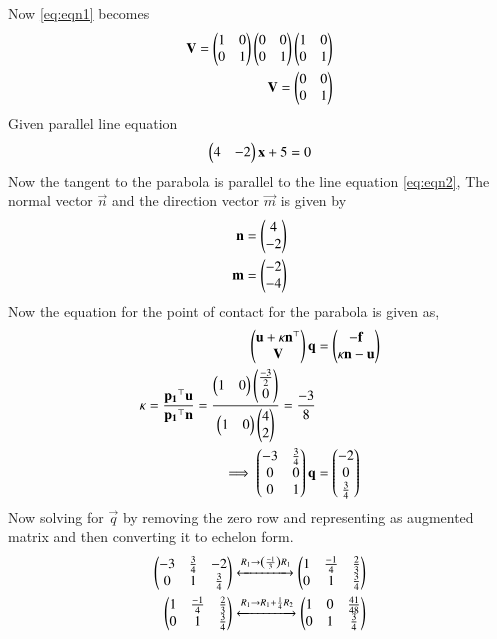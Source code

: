 \documentclass[journal,12pt,twocolumn]{IEEEtran}
\begin{document}
Now \eqref{eq:eqn1} becomes
\begin{align}
    \mathbf{V}=\begin{pmatrix}1&0 \\ 0&1\end{pmatrix}\begin{pmatrix}0&0 \\ 0&1\end{pmatrix}\begin{pmatrix}1&0 \\ 0&1\end{pmatrix}
    \\
    \mathbf{V}=\begin{pmatrix}0&0 \\ 0&1\end{pmatrix}
\end{align}
Given parallel line equation 
\begin{align}
 \begin{pmatrix}4&-2\end{pmatrix}\mathbf{x} + 5 = 0\label{eq:eqn2}
\end{align}
Now the tangent to the parabola is parallel to the line equation \eqref{eq:eqn2},
The normal vector $\vec{n}$ and the direction vector $\vec{m}$ is given by 
\begin{align}
    \mathbf{n}=\begin{pmatrix}4 \\ -2\end{pmatrix} \label{eq:eqn5}
    \\
    \mathbf{m}=\begin{pmatrix}-2 \\ -4\end{pmatrix}
\end{align}
Now the equation for the point of contact for the parabola is given as,
\begin{align}
    \begin{pmatrix}\mathbf{u}+\kappa \mathbf{n}^{\top} \\ \mathbf{V} \end{pmatrix}\mathbf{q} &= \begin{pmatrix}\mathbf{-f}\\\kappa \mathbf{n} -\mathbf{u}\end{pmatrix}
    \\
    \kappa =\frac{\mathbf{p_{1}}^{\top}\mathbf{u}}{\mathbf{p_{1}}^{\top}\mathbf{n}}
    =\frac{\begin{pmatrix}1&0\end{pmatrix}\begin{pmatrix}\frac{-3}{2} \\ 0\end{pmatrix}}{\begin{pmatrix}1&0\end{pmatrix}\begin{pmatrix}4 \\ 2\end{pmatrix}}
    =\frac{-3}{8}
    \\
   \implies\begin{pmatrix}-3&\frac{3}{4} \\ 0&0 \\ 0&1\end{pmatrix} \mathbf{q}&= \begin{pmatrix}-2 \\ 0 \\ \frac{3}{4}\end{pmatrix}
\end{align}
Now solving for $\vec{q}$ by removing the zero row and representing as augmented matrix and then converting it to echelon form.
\begin{align}
    \begin{pmatrix}-3&\frac{3}{4}&-2 \\ 0&1&\frac{3}{4}\end{pmatrix}\xleftrightarrow{R_1\rightarrow \ensuremath{\left(\frac{-1}{3}\right)}R_1} \begin{pmatrix}1&\frac{-1}{4}&\frac{2}{3} \\ 0&1&\frac{3}{4}\end{pmatrix}
    \\
    \begin{pmatrix}1&\frac{-1}{4}&\frac{2}{3} \\ 0&1&\frac{3}{4}\end{pmatrix}\xleftrightarrow{R_1\rightarrow R_1+\frac{1}{4}R_2}\begin{pmatrix}1&0&\frac{41}{48} \\ 0&1&\frac{3}{4}\end{pmatrix} \label{eq:eqn3}
\end{align}
\end{document}
